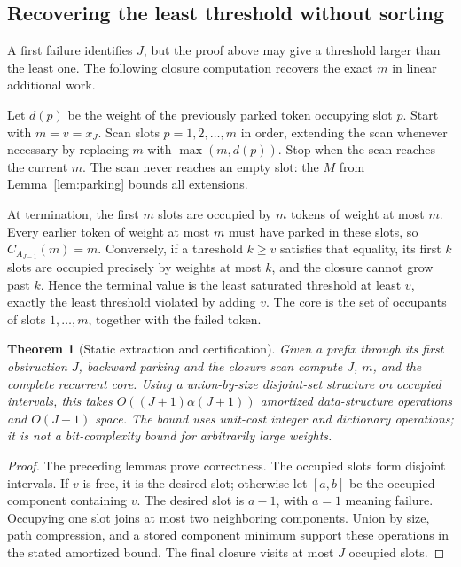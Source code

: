 \documentclass[11pt,letterpaper]{article}
\newtheorem{theorem}{Theorem}[section]
\theoremstyle{definition}
\begin{document}
\subsection{Recovering the least threshold without sorting}
A first failure identifies $J$, but the proof above may give a threshold
larger than the least one. The following closure computation recovers the
exact $m$ in linear additional work.

Let $d(p)$ be the weight of the previously parked token occupying slot $p$.
Start with $m=v=x_J$. Scan slots $p=1,2,\ldots,m$ in order, extending the
scan whenever necessary by replacing $m$ with $\max(m,d(p))$. Stop when the
scan reaches the current $m$. The scan never reaches an empty slot: the
$M$ from Lemma~\ref{lem:parking} bounds all extensions.

At termination, the first $m$ slots are occupied by $m$ tokens of weight at
most $m$. Every earlier token of weight at most $m$ must have parked in
these slots, so $C_{A_{J-1}}(m)=m$. Conversely, if a threshold $k\ge v$
satisfies that equality, its first $k$ slots are occupied precisely by weights
at most $k$, and the closure cannot grow past $k$. Hence the terminal value
is the least saturated threshold at least $v$, exactly the least threshold
violated by adding $v$. The core is the set of occupants of slots
$1,\ldots,m$, together with the failed token.

\begin{theorem}[Static extraction and certification]\label{thm:algorithm}
Given a prefix through its first obstruction $J$, backward parking and the
closure scan compute $J$, $m$, and the complete recurrent core. Using a
union-by-size disjoint-set structure on occupied intervals, this takes
$O((J+1)\alpha(J+1))$ amortized data-structure operations and $O(J+1)$ space.
The bound uses unit-cost integer and dictionary operations; it is not a
bit-complexity bound for arbitrarily large weights.
\end{theorem}
\begin{proof}
The preceding lemmas prove correctness. The occupied slots form disjoint
intervals. If $v$ is free, it is the desired slot; otherwise let $[a,b]$ be
the occupied component containing $v$. The desired slot is $a-1$, with
$a=1$ meaning failure. Occupying one slot joins at most two neighboring
components. Union by size, path compression, and a stored component minimum
support these operations in the stated amortized bound. The final closure
visits at most $J$ occupied slots.
\end{proof}
\end{document}
